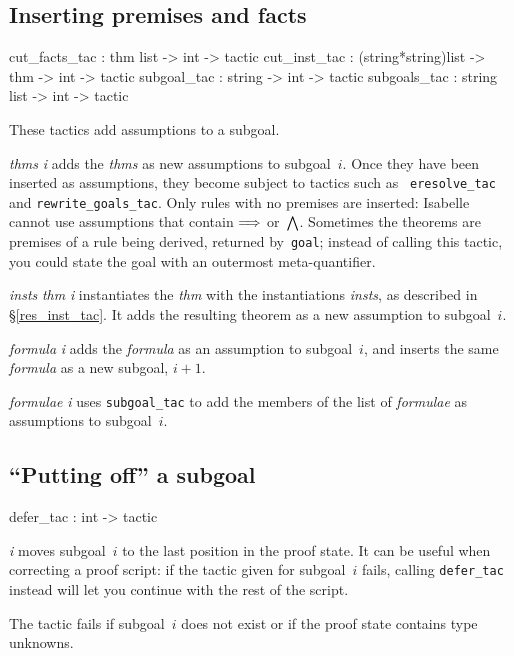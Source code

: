\subsection{Inserting premises and facts}\label{cut_facts_tac}
\begin{ttbox} 
cut_facts_tac : thm list -> int -> tactic
cut_inst_tac  : (string*string)list -> thm -> int -> tactic
subgoal_tac   : string -> int -> tactic
subgoals_tac  : string list -> int -> tactic
\end{ttbox}
These tactics add assumptions to a subgoal.
\begin{ttdescription}
\item[\ttindexbold{cut_facts_tac} {\it thms} {\it i}] 
  adds the {\it thms} as new assumptions to subgoal~$i$.  Once they have
  been inserted as assumptions, they become subject to tactics such as {\tt
    eresolve_tac} and {\tt rewrite_goals_tac}.  Only rules with no premises
  are inserted: Isabelle cannot use assumptions that contain $\Longrightarrow$
  or~$\bigwedge$.  Sometimes the theorems are premises of a rule being
  derived, returned by~{\tt goal}; instead of calling this tactic, you
  could state the goal with an outermost meta-quantifier.

\item[\ttindexbold{cut_inst_tac} {\it insts} {\it thm} {\it i}]
  instantiates the {\it thm} with the instantiations {\it insts}, as
  described in {\S}\ref{res_inst_tac}.  It adds the resulting theorem as a
  new assumption to subgoal~$i$. 

\item[\ttindexbold{subgoal_tac} {\it formula} {\it i}] 
adds the {\it formula} as an assumption to subgoal~$i$, and inserts the same
{\it formula} as a new subgoal, $i+1$.

\item[\ttindexbold{subgoals_tac} {\it formulae} {\it i}] 
  uses {\tt subgoal_tac} to add the members of the list of {\it
    formulae} as assumptions to subgoal~$i$. 
\end{ttdescription}


\subsection{``Putting off'' a subgoal}
\begin{ttbox} 
defer_tac : int -> tactic
\end{ttbox}
\begin{ttdescription}
\item[\ttindexbold{defer_tac} {\it i}] 
  moves subgoal~$i$ to the last position in the proof state.  It can be
  useful when correcting a proof script: if the tactic given for subgoal~$i$
  fails, calling {\tt defer_tac} instead will let you continue with the rest
  of the script.

  The tactic fails if subgoal~$i$ does not exist or if the proof state
  contains type unknowns. 
\end{ttdescription}


